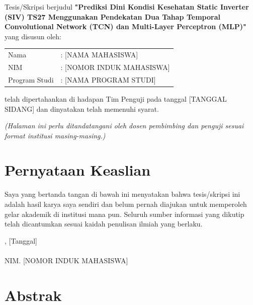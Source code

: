 \documentclass[12pt,a4paper]{report}
\begin{document}
\noindent Tesis/Skripsi berjudul \textbf{"Prediksi Dini Kondisi Kesehatan Static Inverter (SIV) TS27 Menggunakan Pendekatan Dua Tahap Temporal Convolutional Network (TCN) dan Multi-Layer Perceptron (MLP)"} yang disusun oleh:

\begin{center}
\begin{tabular}{ll}
Nama & : [NAMA MAHASISWA] \\
NIM  & : [NOMOR INDUK MAHASISWA] \\
Program Studi & : [NAMA PROGRAM STUDI] \\
\end{tabular}
\end{center}

\noindent telah dipertahankan di hadapan Tim Penguji pada tanggal [TANGGAL SIDANG] dan dinyatakan telah memenuhi syarat.

\vspace{2cm}
\noindent\textit{(Halaman ini perlu ditandatangani oleh dosen pembimbing dan penguji sesuai format institusi masing-masing.)}

\chapter*{Pernyataan Keaslian}
\noindent Saya yang bertanda tangan di bawah ini menyatakan bahwa tesis/skripsi ini adalah hasil karya saya sendiri dan belum pernah diajukan untuk memperoleh gelar akademik di institusi mana pun. Seluruh sumber informasi yang dikutip telah dicantumkan sesuai kaidah penulisan ilmiah yang berlaku.

\vspace{2cm}
, [Tanggal] \\[2cm]
 \\
NIM. [NOMOR INDUK MAHASISWA]

\chapter*{Abstrak}
\end{document}
